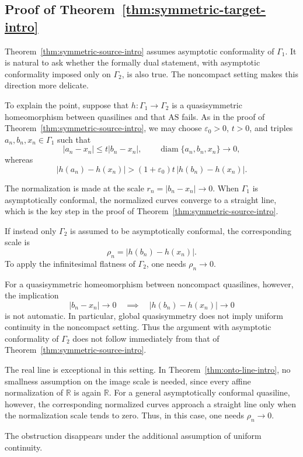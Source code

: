 \documentclass[10pt,a4paper]{amsart}
\numberwithin{equation}{section}
\newcommand{\R}{\mathbb{R}}
\newcommand{\diam}{\operatorname{diam}}
\begin{document}
\subsection{Proof of Theorem~\ref{thm:symmetric-target-intro}}

Theorem~\ref{thm:symmetric-source-intro} assumes asymptotic conformality of $\Gamma_1$.  
It is natural to ask whether the formally dual statement, with asymptotic conformality imposed only on $\Gamma_2$, is also true.  
The noncompact setting makes this direction more delicate.

To explain the point, suppose that $h\colon \Gamma_1 \to \Gamma_2$ is a quasisymmetric homeomorphism between quasilines and that $\mathrm{AS}$ fails.
As in the proof of Theorem~\ref{thm:symmetric-source-intro}, we may choose $\varepsilon_0>0$, $t>0$, and triples $a_n,b_n,x_n\in\Gamma_1$ such that
\[
 |a_n-x_n|\leq t|b_n-x_n|,\qquad \diam\{a_n,b_n,x_n\}\to 0,
\]
whereas
\[
 |h(a_n)-h(x_n)| >(1+\varepsilon_0)t\,|h(b_n)-h(x_n)|.
\]

The normalization is made at the scale $r_n=|b_n-x_n|\to0$.  
When $\Gamma_1$ is asymptotically conformal, the normalized curves converge to a straight line, which is the key step in the proof of Theorem~\ref{thm:symmetric-source-intro}.

If instead only $\Gamma_2$ is assumed to be asymptotically conformal, the
corresponding scale is
\[
 \rho_n=|h(b_n)-h(x_n)|.
\]
To apply the infinitesimal flatness of $\Gamma_2$, one needs $\rho_n\to 0$.

For a quasisymmetric homeomorphism  between noncompact quasilines, however, the implication
\[
 |b_n-x_n|\to 0\quad\implies\quad|h(b_n)-h(x_n)|\to 0
\]
is not automatic.  
In particular, global quasisymmetry does not imply uniform continuity in the noncompact setting.  
Thus the argument with asymptotic conformality of $\Gamma_2$ does not follow immediately from that of Theorem~\ref{thm:symmetric-source-intro}.

The real line is exceptional in this setting.  
In Theorem~\ref{thm:onto-line-intro}, no smallness assumption on the image scale is needed, since every affine normalization of $\R$ is again $\R$.  
For a general asymptotically conformal quasiline, however, the corresponding normalized curves approach a straight line only when the normalization scale tends to zero.  
Thus, in this case, one needs $\rho_n\to0$.

The obstruction disappears under the additional assumption of uniform continuity.
\end{document}
